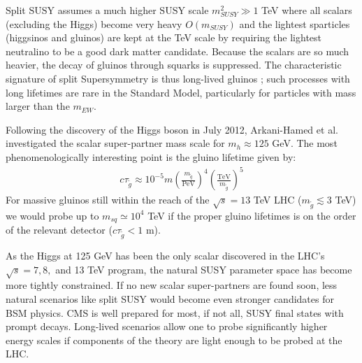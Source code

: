 Split SUSY assumes a much higher SUSY scale $m_{SUSY}^2 \gg 1$ TeV where all scalars
 (excluding the Higgs) become very heavy $O(m_{SUSY})$ and the lightest sparticles (higgsinos and gluinos) are kept at the TeV scale by requiring 
the lightest neutralino to be a good dark matter candidate. Because the scalars are so much heavier, the decay of gluinos through squarks is suppressed.
The characteristic signature of split Supersymmetry is thus long-lived gluinos \cite{hewett}; such processes 
with long lifetimes are rare in the Standard Model, particularly for particles with mass larger than the $m_{EW}$.

Following the discovery of the Higgs boson in July 2012, Arkani-Hamed et al. \cite{nimahiggs} investigated  the scalar super-partner mass scale for $m_h \approx 125$ GeV. %
The most phenomenologically interesting point is the gluino lifetime given by:
\begin{align*}
c\tau_{\tilde{g}} \approx 10^{-5} m \left ( \frac{m_{\tilde{q}}}{\mbox{PeV}} \right )^4 \left( \frac{\mbox{TeV}}{m_{\tilde{g} }}\right)^5
\end{align*}
For massive gluinos still within the reach of the $\sqrt{s} = 13$ TeV LHC ($m_{\tilde{g}} \lesssim 3$ TeV) we would probe up to $m_{sq} \simeq 10^4$ TeV if the proper gluino lifetimes is on the order of the relevant detector ($c\tau_{\tilde{g}} < 1$ m).

As the Higgs at 125 GeV has been the only scalar discovered in the LHC's $\sqrt{s}= 7,8,$ and 13 TeV program, the natural SUSY parameter space has become more tightly constrained. 
If no new scalar super-partners are found soon, less natural scenarios like split SUSY would become even stronger candidates for BSM physics.
 CMS is well prepared for most, if not all, SUSY final states with prompt decays. Long-lived scenarios allow one to probe 
significantly higher energy scales if components of the theory are light enough to be probed at the LHC.
